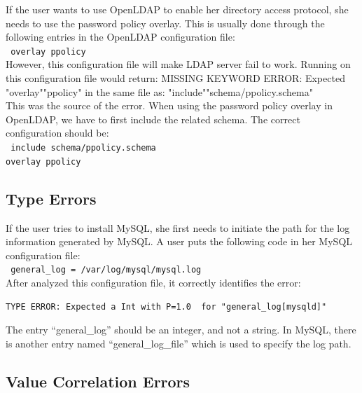 If the user wants to use OpenLDAP to enable her directory access
protocol, she needs to use the password policy overlay. This is usually
done through the following entries in the OpenLDAP configuration file:\\
\texttt{
 \hspace*{3em}overlay ppolicy\\}
However, this configuration file will make LDAP server fail to work.
Running \app on this configuration file would return:
MISSING KEYWORD ERROR: Expected "overlay""ppolicy" in the same file as: "include""schema/ppolicy.schema"\\
This was the source of the error. When using the password policy overlay
in OpenLDAP, we have to first include the related schema. The correct configuration should be:\\
\texttt{
 \hspace*{3em}include schema/ppolicy.schema\\
 \hspace*{3em}overlay ppolicy\\
}

\subsection{Type Errors}

If the user tries to install MySQL, she first needs to 
initiate the path for the
log information generated by MySQL. A user puts the following code in 
her MySQL configuration file:\\
\texttt{
 \hspace*{3em}general\_log = /var/log/mysql/mysql.log\\}
After \app analyzed this configuration file, it correctly identifies the error:
\begin{verbatim}
TYPE ERROR: Expected a Int with P=1.0  for "general_log[mysqld]"
\end{verbatim}
The entry ``general\_log'' should be an integer, 
and not a string. In MySQL, there is another entry named
``general\_log\_file'' which is used to specify the log path.  

\subsection{Value Correlation Errors}

